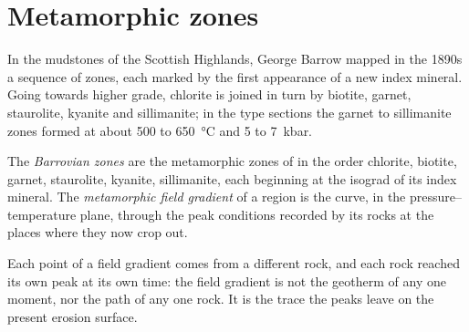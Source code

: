 \section{Metamorphic zones}\label{sec:b2:pt-paths:zones}

In the mudstones of the Scottish Highlands, George Barrow mapped in the 1890s a sequence of
zones, each marked by the first appearance of a new index mineral. Going towards higher
grade, chlorite is joined in turn by biotite, garnet, staurolite, kyanite and sillimanite;
in the type sections the garnet to sillimanite zones formed at about 500 to
\qty{650}{\celsius} and 5 to \qty{7}{kbar}.

\begin{definition}\label{def:b2:pt-paths:barrovian}
The \emph{Barrovian zones} are the metamorphic zones of
 in the order chlorite, biotite, garnet, staurolite, kyanite, sillimanite,
each beginning at the isograd of its index mineral. The \emph{metamorphic field
gradient} of a region is the curve, in the
pressure--temperature plane, through the peak conditions recorded by its rocks at the
places where they now crop out.
\end{definition}

Each point of a field gradient comes from a different rock, and each rock reached its own
peak at its own time: the field gradient is not the geotherm of any one moment, nor the
path of any one rock. It is the trace the peaks leave on the present erosion surface.

\begin{omfigure}
\centering
{}
\par{}
\end{omfigure}

